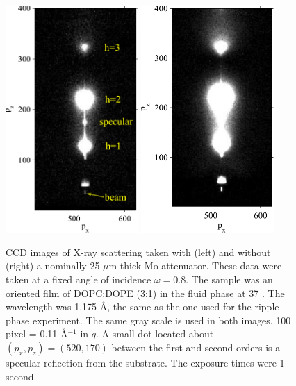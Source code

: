 \begin{figure}[jtbp]
  \centering
  \includegraphics[width=0.45\textwidth]{figures/ripple/MMs/laxs/olddopc045_labels}
  \quad
  \includegraphics[width=0.45\textwidth]{figures/ripple/MMs/laxs/olddopc044}
  \caption{CCD images of X-ray scattering taken with (left) and without 
  (right) a nominally 25 $\mu$m thick Mo attenuator. These data were taken 
  at a fixed angle of incidence $\omega=0.8$\textdegree. The sample was an oriented film of 
  DOPC:DOPE (3:1) in the fluid phase at 37 \textcelsius. The wavelength
  was 1.175 \AA, the same as the one used for the ripple phase experiment.
  The same gray scale is used in both images. 100 pixel =  0.11 \AA$^{-1}$ in $q$. 
  A small dot located about $(p_x,p_z)=(520,170)$ between the first and second orders is 
  a specular reflection from the substrate. The exposure times were 1 second.}
  \label{fig:olddopc}
\end{figure}

